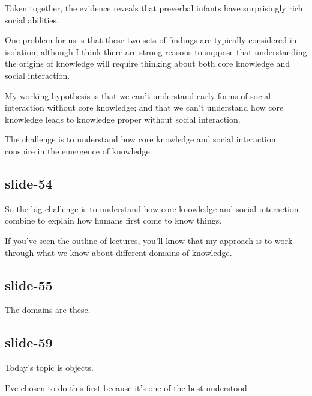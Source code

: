 \documentclass[12pt,\papersize]{extarticle}
\begin{document}
Taken together, the evidence reveals that preverbal infants have surprisingly rich social abilities.
 
One problem for us is that these two sets of findings are typically considered in isolation, although I think there are strong reasons to suppose that understanding the origins of knowledge will require thinking about both core knowledge and social interaction.
 
My working hypothesis is that we can't understand early forms of social interaction without core knowledge; and that we can't understand how core knowledge leads to knowledge proper without social interaction.
 
The challenge is to understand how core knowledge and social interaction conspire in the emergence of knowledge.
 
 
 
\subsection{slide-54}
So the big challenge is to understand how core knowledge and social interaction combine to explain how humans first come to know things.
 
If you've seen the outline of lectures, you'll know that my approach is to work through what we know about different domains of knowledge.
 
 
 
\subsection{slide-55}
The domains are these.
 
 
 
\subsection{slide-59}
Today's topic is objects.
 
I've chosen to do this first because it's one of the best understood.
 
 






\end{document}
